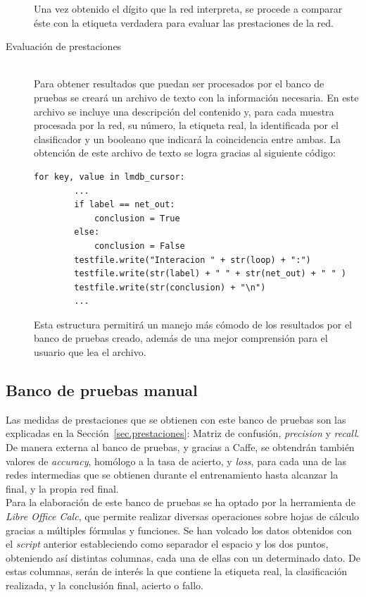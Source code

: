 \begin{description}
	Una vez obtenido el dígito que la red interpreta, se procede a comparar éste con la etiqueta verdadera para evaluar las prestaciones de la red.
	\vspace{5pt}
	\item[Evaluación de prestaciones] \hfill 
	\vspace{5pt}
	\\
	Para obtener resultados que puedan ser procesados por el banco de pruebas se creará un archivo de texto con la información necesaria. En este archivo se incluye una descripción del contenido y, para cada muestra procesada por la red, su número, la etiqueta real, la identificada por el clasificador y un booleano que indicará la coincidencia entre ambas. La obtención de este archivo de texto se logra gracias al siguiente código:
	\vspace{10pt}
	\begin{lstlisting}[frame=single]
	for key, value in lmdb_cursor:
		...
		if label == net_out:
			conclusion = True
		else:
			conclusion = False
		testfile.write("Interacion " + str(loop) + ":")
		testfile.write(str(label) + " " + str(net_out) + " " )
		testfile.write(str(conclusion) + "\n")
		...
	\end{lstlisting}
	
	Esta estructura permitirá un manejo más cómodo de los resultados por el banco de pruebas creado, además de una mejor comprensión para el usuario que lea el archivo.
\end{description}

\subsection{Banco de pruebas manual}
Las medidas de prestaciones que se obtienen con este banco de pruebas son las explicadas en la Sección~\ref{sec.prestaciones}: Matriz de confusión, \textit{precision} y \textit{recall}. De manera externa al banco de pruebas, y gracias a Caffe, se obtendrán también valores de \textit{accuracy}, homólogo a la tasa de acierto, y \textit{loss}, para cada una de las redes intermedias que se obtienen durante el entrenamiento hasta alcanzar la final, y la propia red final.\\

Para la elaboración de este banco de pruebas se ha optado por la herramienta de \textit{Libre Office Calc}, que permite realizar diversas operaciones sobre hojas de cálculo gracias a múltiples fórmulas y funciones. Se han volcado los datos obtenidos con el \textit{script} anterior estableciendo como separador el espacio y los dos puntos, obteniendo así distintas columnas, cada una de ellas con un determinado dato. De estas columnas, serán de interés la que contiene la etiqueta real, la clasificación realizada, y la conclusión final, acierto o fallo.\\

